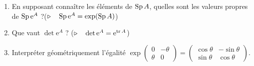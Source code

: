 \begin{exmn}[Cadeaux]
	\begin{slshape}
		\begin{enumerate}[label=(\textit{\alph*})]
			\item En supposant connaître les éléments de $\operatorname{Sp} A$, quelles sont les valeurs propres de $\operatorname{Sp}\mathrm{e}^A$ ?\quad\quad\quad($\triangleright\quad \operatorname{Sp} \mathrm{e}^A = \exp(\operatorname{Sp} A)$)
			\item Que vaut $\det \mathrm{e}^{A}$ ? \quad\quad\quad($\triangleright\quad \operatorname{det} \mathrm{e}^{A} = \mathrm{e}^{\operatorname{tr} A}$)
			\item Interpréter géométriquement l'égalité $\exp \begin{pmatrix} 0 & - \theta\\ \theta & 0 \end{pmatrix} = \begin{pmatrix} \cos \theta & - \sin\theta\\ \sin \theta & \cos \theta \end{pmatrix}$.
		\end{enumerate}
	\end{slshape}


\end{exmn}

